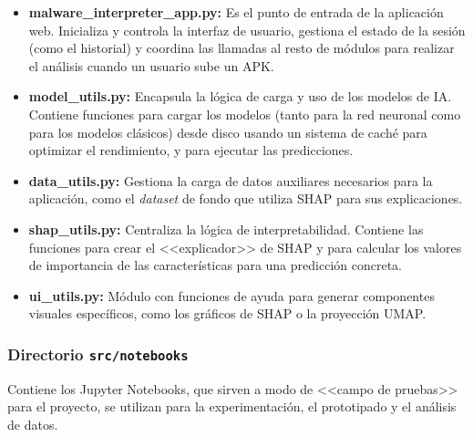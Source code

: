\begin{itemize}
	\item \textbf{malware\_interpreter\_app.py:} Es el punto de entrada de la aplicación web. Inicializa y controla la interfaz de usuario, gestiona el estado de la sesión (como el historial) y coordina las llamadas al resto de módulos para realizar el análisis cuando un usuario sube un APK.
	
	\item \textbf{model\_utils.py:} Encapsula la lógica de carga y uso de los modelos de IA. Contiene funciones para cargar los modelos (tanto para la red neuronal como para los modelos clásicos) desde disco usando un sistema de caché para optimizar el rendimiento, y para ejecutar las predicciones.
	
	\item \textbf{data\_utils.py:} Gestiona la carga de datos auxiliares necesarios para la aplicación, como el \textit{dataset} de fondo que utiliza SHAP para sus explicaciones.
	
	\item \textbf{shap\_utils.py:} Centraliza la lógica de interpretabilidad. Contiene las funciones para crear el <<explicador>> de SHAP y para calcular los valores de importancia de las características para una predicción concreta.
	
	\item \textbf{ui\_utils.py:} Módulo con funciones de ayuda para generar componentes visuales específicos, como los gráficos de SHAP o la proyección UMAP.
\end{itemize}

\subsubsection{Directorio \texttt{src/notebooks}}
Contiene los Jupyter Notebooks, que sirven a modo de <<campo de pruebas>> para el proyecto, se utilizan para la experimentación, el prototipado y el análisis de datos.

